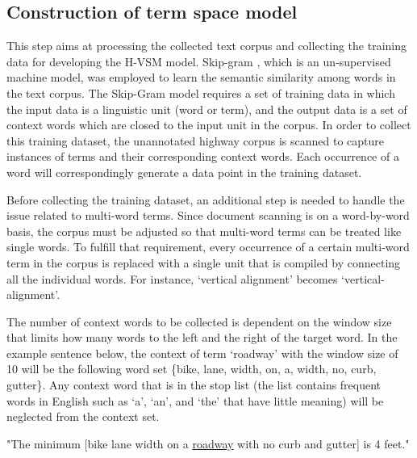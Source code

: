 \documentclass[Journal, BackFigs, DoubleSpace]{ascelike} %
\begin{document}
\subsection{Construction of term space model}
%
This step aims at processing the collected text corpus and collecting the training data for developing the H-VSM model. Skip-gram \cite{mikolov13a}, which is an un-supervised machine model, was employed to learn the semantic similarity among words in the text corpus. The Skip-Gram model requires a set of training data in which the input data is a linguistic unit (word or term), and the output data is a set of context words which are closed to the input unit in the corpus. In order to collect this training dataset, the unannotated highway corpus is scanned to capture instances of terms and their corresponding context words. Each occurrence of a word will correspondingly generate a data point in the training dataset.
\par
Before collecting the training dataset, an additional step is needed to handle the issue related to multi-word terms. Since document scanning is on a word-by-word basis, the corpus must be adjusted so that multi-word terms can be treated like single words. To fulfill that requirement, every occurrence of a certain multi-word term in the corpus is replaced with a single unit that is compiled by connecting all the individual words. For instance, `vertical alignment' becomes `vertical-alignment'.
\par
The number of context words to be collected is dependent on the window size that limits how many words to the left and the right of the target word. In the example sentence below, the context of term `roadway' with the window size of 10 will be the following word set \{bike, lane, width, on, a, width, no, curb, gutter\}. Any context word that is in the stop list (the list contains frequent words in English such as `a', `an', and `the' that have little meaning) will be neglected from the context set.
%
\begin{center}
	"The minimum [bike lane width on a \underline{roadway} with no curb and gutter] is 4 feet."
\end{center}
%
%
\end{document}
